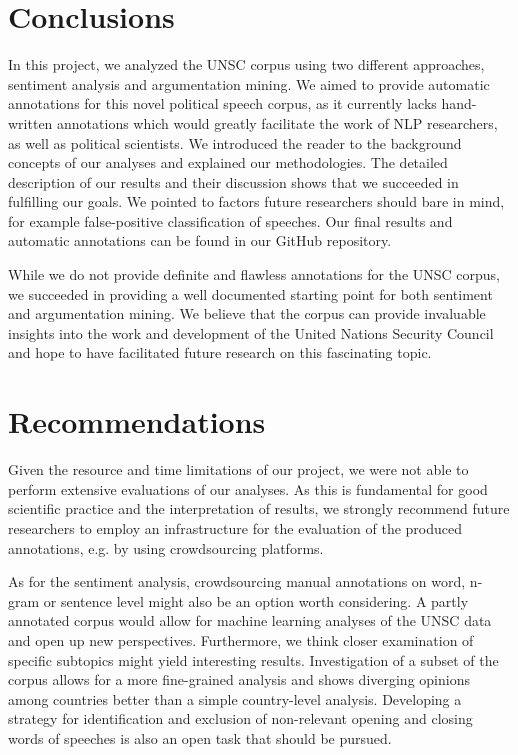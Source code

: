 \section{Conclusions}
\label{conclu}

In this project, we analyzed the UNSC corpus using two different approaches, sentiment analysis and argumentation mining. We aimed to provide automatic annotations for this novel political speech corpus, as it currently lacks hand-written annotations which would greatly facilitate the work of NLP researchers, as well as political scientists. We introduced the reader to the background concepts of our analyses and explained our methodologies. The detailed description of our results and their discussion shows that we succeeded in fulfilling our goals. We pointed to factors future researchers should bare in mind, for example false-positive classification of speeches. Our final results and automatic annotations can be found in our GitHub repository\footnotemark[2].

While we do not provide definite and flawless annotations for the UNSC corpus, we succeeded in providing a well documented starting point for both sentiment and argumentation mining. We believe that the corpus can provide invaluable insights into the work and development of the United Nations Security Council and hope to have facilitated future research on this fascinating topic.

\section{Recommendations}
\label{reco}

 Given the resource and time limitations of our project, we were not able to perform extensive evaluations of our analyses. As this is fundamental for good scientific practice and the interpretation of results, we strongly recommend future researchers to employ an infrastructure for the evaluation of the produced annotations, e.g. by using crowdsourcing platforms. 
 
 As for the sentiment analysis, crowdsourcing manual annotations on word, n-gram or sentence level might also be an option worth considering. A partly annotated corpus would allow for machine learning analyses of the UNSC data and open up new perspectives. Furthermore, we think closer examination of specific subtopics might yield interesting results. Investigation of a subset of the corpus allows for a more fine-grained analysis and shows diverging opinions among countries better than a simple country-level analysis. Developing a strategy for identification and exclusion of non-relevant opening and closing words of speeches is also an open task that should be pursued.
 
